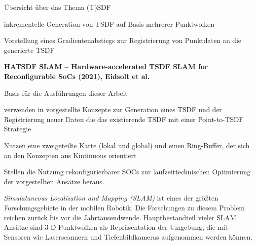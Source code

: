\begin{description}
\item
Übersicht über das Thema (T)SDF
\item
inkrementelle Generation von TSDF auf Basis mehrerer Punktwolken
\item
Vorstellung eines Gradientenabstiegs zur Registrierung von Punktdaten an die generierte TSDF
\end{description}


\textbf{HATSDF SLAM – Hardware-accelerated TSDF SLAM for Reconfigurable SoCs (2021), Eidsolt et al.}

\begin{description}
\item
Basis für die Ausführungen dieser Arbeit
\item
verwenden in \cite{Canelhas2017TruncatedSD} vorgestellte Konzepte zur Generation eines TSDF und der Registrierung neuer Daten die das existierende TSDF mit einer Point-to-TSDF Strategie
\item
Nutzen eine zweigeteilte Karte (lokal und global) und einen Ring-Buffer, der sich an den Konzepten aus Kintinuous \cite{whelan2012kintinuous} orientiert
\item
Stellen die Nutzung rekonfigurierbarer SOCs zur laufzeittechnischen Optimierung der vorgestellten Ansätze heraus.
\end{description}




\textit{Simulataneous Localization and Mapping (SLAM)} ist eines der größten Forschungsgebiete in der mobilen Robotik. Die Forschungen zu diesem Problem reichen zurück bis vor die Jahrtausendwende.
Hauptbestandteil vieler SLAM Ansätze sind 3-D Punktwolken als Repräsentation der Umgebung, die mit Sensoren wie Laserscannern und Tiefenbildkameras aufgenommen werden können.



